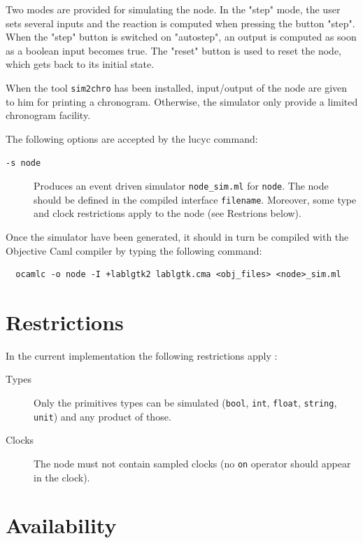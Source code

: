 \documentclass[11pt,titlepage,twoside]{report}
\begin{document}
Two modes are provided for simulating the node. In the "step" mode,
the user sets several inputs and the reaction is computed when
pressing the button "step". When the "step" button is switched on
"autostep", an output is computed as soon as a boolean input becomes
true.  The "reset" button is used to reset the node, which gets back
to its initial state.

When the tool \verb-sim2chro- has been installed, input/output of
the node are given to him for printing a chronogram. Otherwise, the
simulator only provide a limited chronogram facility.

The following options are accepted by the lucyc command:

\begin{description}
\item[\tt -s node]
Produces an event driven simulator
\verb-node_sim.ml-
for
\verb-node-.
The node should be defined in the compiled interface
\verb-filename-.
Moreover, some
type and clock restrictions apply to the node (see Restrions below).
\end{description}

Once the simulator have been generated, it should in turn be compiled
with the Objective Caml compiler by typing the following command:

\begin{verbatim}
  ocamlc -o node -I +lablgtk2 lablgtk.cma <obj_files> <node>_sim.ml
\end{verbatim}

\section{Restrictions}

In the current implementation the following restrictions apply :

\begin{description}
\item[Types]
Only the primitives types can be simulated (\verb-bool-, \verb-int-,
\verb-float-, \verb-string-, \verb-unit-) and any product of those.

\item[Clocks]
The node must not contain sampled clocks (no
\verb-on- operator should appear in the clock).
\end{description}


\section{Availability}
\end{document}
